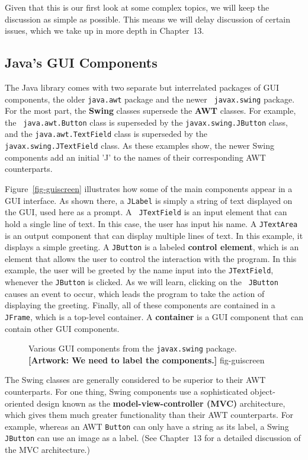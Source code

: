 Given that this is our first look at some complex topics, we will keep
the discussion as simple as possible. This means we will delay
discussion of certain issues, which we take up in more depth in
Chapter~13.

\subsection{Java's GUI Components}

The Java library comes with two separate but interrelated packages of
GUI components, the older {\tt java.awt} package and the newer {\tt
javax.swing} package.  For the most part, the {\bf Swing} classes
supersede the {\bf AWT} classes. For example, the {\tt
java.awt.Button} class is superseded by the {\tt javax.swing.JButton}
class, and the {\tt java.awt.TextField} class is superseded by the
{\tt javax.swing.JTextField} class.  As these examples show, the newer
Swing components add an initial 'J' to the names of their
corresponding AWT counterparts.

Figure~\ref{fig-guiscreen} illustrates how some of the main components
appear in a GUI interface. As shown there, a {\tt JLabel} is simply a
string of text displayed on the GUI, used here as a prompt. A {\tt
JTextField} is an input element that can hold a single line of text.
In this case, the user has input his name. A {\tt JTextArea} is an
output component that can display multiple lines of text. In this
example, it displays a simple greeting.  A {\tt JButton} is a labeled
{\bf control element}, which is an element that allows the user to
control the interaction with the program. In this example, the user
will be greeted by the name input into the {\tt JTextField}, whenever
the {\tt JButton} is clicked. As we will learn, clicking on the {\tt
JButton} causes an event to occur, which leads the program to take the
action of displaying the greeting.  Finally, all of these components
are contained in a {\tt JFrame}, which is a top-level container. A
{\bf container} is a GUI component that can contain other GUI
components.

\begin{figure}[tb]
{Various GUI components from the {\tt javax.swing} package. {\bf [Artwork: We
need to label the components.]}}
{fig-guiscreen}

\end{figure}

The Swing classes are generally considered to be superior to their AWT
counterparts. For one thing, Swing components use a sophisticated
object-oriented design known as the {\bf model-view-controller (MVC)}
architecture, which gives them much greater functionality than their
AWT counterparts. For example, whereas an AWT {\tt Button} can only
have a string as its label, a Swing {\tt JButton} can use an image as
a label. (See Chapter~13 for a detailed discussion of the MVC
architecture.)

